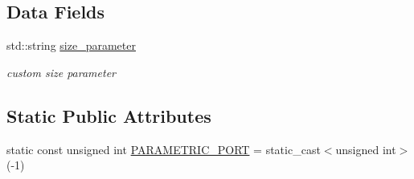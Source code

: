 \subsection*{Data Fields}
\begin{DoxyCompactItemize}
\item 
std\+::string \hyperlink{structport__o_a11b04084ee7c72114e5d55fca832dd27}{size\+\_\+parameter}
\begin{DoxyCompactList}\small\item\em custom size parameter \end{DoxyCompactList}\end{DoxyCompactItemize}
\subsection*{Static Public Attributes}
\begin{DoxyCompactItemize}
\item 
static const unsigned int \hyperlink{structport__o_ac68564ec9d759f9f6d71dcaef3fe8068}{P\+A\+R\+A\+M\+E\+T\+R\+I\+C\+\_\+\+P\+O\+RT} = static\+\_\+cast$<$unsigned int$>$(-\/1)
\end{DoxyCompactItemize}
